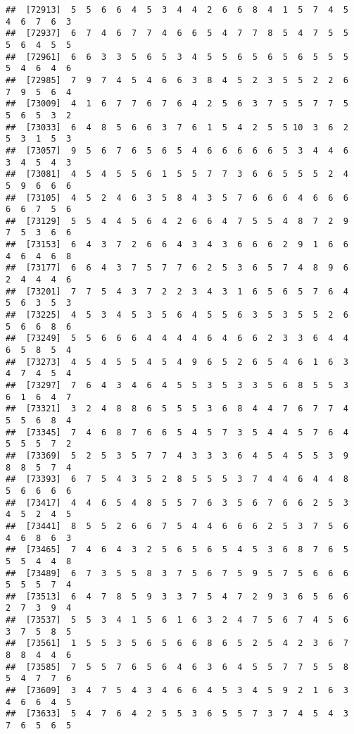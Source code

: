 \documentclass[
]{book}
\begin{document}
\begin{verbatim}
##  [72913]  5  5  6  6  4  5  3  4  4  2  6  6  8  4  1  5  7  4  5  4  6  7  6  3
##  [72937]  6  7  4  6  7  7  4  6  6  5  4  7  7  8  5  4  7  5  5  5  6  4  5  5
##  [72961]  6  6  3  3  5  6  5  3  4  5  5  6  5  6  5  6  5  5  5  5  4  6  4  6
##  [72985]  7  9  7  4  5  4  6  6  3  8  4  5  2  3  5  5  2  2  6  7  9  5  6  4
##  [73009]  4  1  6  7  7  6  7  6  4  2  5  6  3  7  5  5  7  7  5  5  6  5  3  2
##  [73033]  6  4  8  5  6  6  3  7  6  1  5  4  2  5  5 10  3  6  2  5  3  1  5  3
##  [73057]  9  5  6  7  6  5  6  5  4  6  6  6  6  6  5  3  4  4  6  3  4  5  4  3
##  [73081]  4  5  4  5  5  6  1  5  5  7  7  3  6  6  5  5  5  2  4  5  9  6  6  6
##  [73105]  4  5  2  4  6  3  5  8  4  3  5  7  6  6  6  4  6  6  6  6  6  7  5  6
##  [73129]  5  5  4  4  5  6  4  2  6  6  4  7  5  5  4  8  7  2  9  7  5  3  6  6
##  [73153]  6  4  3  7  2  6  6  4  3  4  3  6  6  6  2  9  1  6  6  4  6  4  6  8
##  [73177]  6  6  4  3  7  5  7  7  6  2  5  3  6  5  7  4  8  9  6  2  4  4  4  6
##  [73201]  7  7  5  4  3  7  2  2  3  4  3  1  6  5  6  5  7  6  4  5  6  3  5  3
##  [73225]  4  5  3  4  5  3  5  6  4  5  5  6  3  5  3  5  5  2  6  5  6  6  8  6
##  [73249]  5  5  6  6  6  4  4  4  4  6  4  6  6  2  3  3  6  4  4  6  5  8  5  4
##  [73273]  4  5  4  5  5  4  5  4  9  6  5  2  6  5  4  6  1  6  3  4  7  4  5  4
##  [73297]  7  6  4  3  4  6  4  5  5  3  5  3  3  5  6  8  5  5  3  6  1  6  4  7
##  [73321]  3  2  4  8  8  6  5  5  5  3  6  8  4  4  7  6  7  7  4  5  5  6  8  4
##  [73345]  7  4  6  8  7  6  6  5  4  5  7  3  5  4  4  5  7  6  4  5  5  5  7  2
##  [73369]  5  2  5  3  5  7  7  4  3  3  3  6  4  5  4  5  5  3  9  8  8  5  7  4
##  [73393]  6  7  5  4  3  5  2  8  5  5  5  3  7  4  4  6  4  4  8  5  6  6  6  6
##  [73417]  4  4  6  5  4  8  5  5  7  6  3  5  6  7  6  6  2  5  3  4  5  2  4  5
##  [73441]  8  5  5  2  6  6  7  5  4  4  6  6  6  2  5  3  7  5  6  4  6  8  6  3
##  [73465]  7  4  6  4  3  2  5  6  5  6  5  4  5  3  6  8  7  6  5  5  5  4  4  8
##  [73489]  6  7  3  5  5  8  3  7  5  6  7  5  9  5  7  5  6  6  6  5  5  5  7  4
##  [73513]  6  4  7  8  5  9  3  3  7  5  4  7  2  9  3  6  5  6  6  2  7  3  9  4
##  [73537]  5  5  3  4  1  5  6  1  6  3  2  4  7  5  6  7  4  5  6  3  7  5  8  5
##  [73561]  1  5  5  3  5  6  5  6  6  8  6  5  2  5  4  2  3  6  7  8  8  4  4  6
##  [73585]  7  5  5  7  6  5  6  4  6  3  6  4  5  5  7  7  5  5  8  5  4  7  7  6
##  [73609]  3  4  7  5  4  3  4  6  6  4  5  3  4  5  9  2  1  6  3  4  6  6  4  5
##  [73633]  5  4  7  6  4  2  5  5  3  6  5  5  7  3  7  4  5  4  3  7  6  5  6  5

\end{verbatim}
\end{document}
